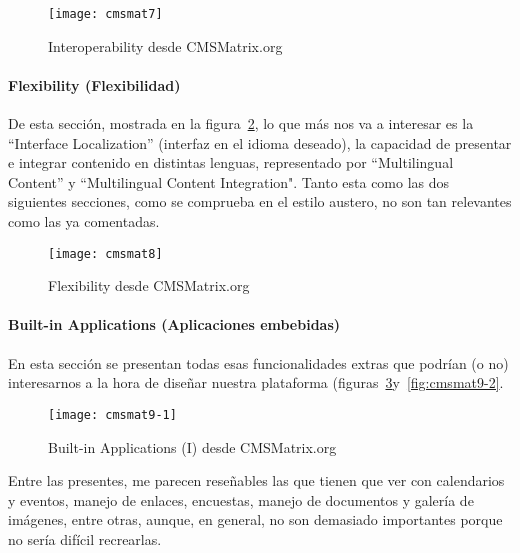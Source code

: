 \begin{figure}
\begin{narrow}{-0.12\linewidth}{-0.12\linewidth}
\centering
\texttt{[image: cmsmat7]}
\caption{Interoperability desde CMSMatrix.org}
\label{fig:cmsmat7}
\end{narrow}
\end{figure}



\paragraph{Flexibility (Flexibilidad)}


\par De esta sección, mostrada en la figura~\ref{fig:cmsmat8}, lo que más nos va a interesar es la ``Interface Localization'' (interfaz en el idioma deseado), la capacidad de presentar e integrar contenido en distintas lenguas, representado por ``Multilingual Content'' y ``Multilingual Content Integration". Tanto esta como las dos siguientes secciones, como se comprueba en el estilo austero, no son tan relevantes como las ya comentadas.

\begin{figure}
\begin{narrow}{-0.12\linewidth}{-0.12\linewidth}
\centering
\texttt{[image: cmsmat8]}
\caption{Flexibility desde CMSMatrix.org}
\label{fig:cmsmat8}
\end{narrow}
\end{figure}


\paragraph{Built-in Applications (Aplicaciones embebidas)}


\par En esta sección se presentan todas esas funcionalidades extras que podrían (o no) interesarnos a la hora de diseñar nuestra plataforma (figuras~\ref{fig:cmsmat9-1}y~\ref{fig:cmsmat9-2}. 

\begin{figure}
\begin{narrow}{-0.12\linewidth}{-0.12\linewidth}
\centering
\texttt{[image: cmsmat9-1]}
\caption{Built-in Applications (I) desde CMSMatrix.org}
\label{fig:cmsmat9-1}
\end{narrow}
\end{figure}

\par Entre las presentes, me parecen reseñables las que tienen que ver con calendarios y eventos, manejo de enlaces, encuestas, manejo de documentos y galería de imágenes, entre otras, aunque, en general, no son demasiado importantes porque no sería difícil recrearlas.

